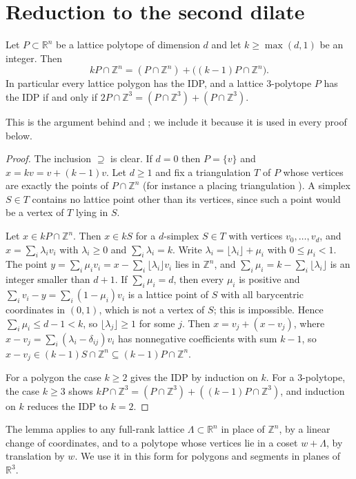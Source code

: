 \documentclass[12pt]{article}
\newcommand{\R}{\mathbb{R}}
\newcommand{\Z}{\mathbb{Z}}
\begin{document}
\section{Reduction to the second dilate}

\begin{lemma}\label{lem:reduction}
Let $P\subset\R^n$ be a lattice polytope of dimension $d$ and let $k\ge\max(d,1)$ be an integer. Then
\[ kP\cap\Z^n=(P\cap\Z^n)+\bigl((k-1)P\cap\Z^n\bigr). \]
In particular every lattice polygon has the IDP, and a lattice $3$-polytope $P$ has the IDP if and only if $2P\cap\Z^3=(P\cap\Z^3)+(P\cap\Z^3)$.
\end{lemma}

This is the argument behind \cite[Theorem~1.3.3]{BGT97} and \cite{EW91}; we include it because it is used in every proof below.

\begin{proof}
The inclusion $\supseteq$ is clear. If $d=0$ then $P=\{v\}$ and $x=kv=v+(k-1)v$. Let $d\ge1$ and fix a triangulation $T$ of $P$ whose vertices are exactly the points of $P\cap\Z^n$ (for instance a placing triangulation \cite{DRS10}). A simplex $S\in T$ contains no lattice point other than its vertices, since such a point would be a vertex of $T$ lying in $S$.

Let $x\in kP\cap\Z^n$. Then $x\in kS$ for a $d$-simplex $S\in T$ with vertices $v_0,\dots,v_d$, and $x=\sum_i\lambda_iv_i$ with $\lambda_i\ge0$ and $\sum_i\lambda_i=k$. Write $\lambda_i=\lfloor\lambda_i\rfloor+\mu_i$ with $0\le\mu_i<1$. The point $y=\sum_i\mu_iv_i=x-\sum_i\lfloor\lambda_i\rfloor v_i$ lies in $\Z^n$, and $\sum_i\mu_i=k-\sum_i\lfloor\lambda_i\rfloor$ is an integer smaller than $d+1$. If $\sum_i\mu_i=d$, then every $\mu_i$ is positive and $\sum_iv_i-y=\sum_i(1-\mu_i)v_i$ is a lattice point of $S$ with all barycentric coordinates in $(0,1)$, which is not a vertex of $S$; this is impossible. Hence $\sum_i\mu_i\le d-1<k$, so $\lfloor\lambda_j\rfloor\ge1$ for some $j$. Then $x=v_j+(x-v_j)$, where $x-v_j=\sum_i(\lambda_i-\delta_{ij})v_i$ has nonnegative coefficients with sum $k-1$, so $x-v_j\in(k-1)S\cap\Z^n\subseteq(k-1)P\cap\Z^n$.

For a polygon the case $k\ge2$ gives the IDP by induction on $k$. For a $3$-polytope, the case $k\ge3$ shows $kP\cap\Z^3=(P\cap\Z^3)+((k-1)P\cap\Z^3)$, and induction on $k$ reduces the IDP to $k=2$.
\end{proof}

The lemma applies to any full-rank lattice $\Lambda\subset\R^n$ in place of $\Z^n$, by a linear change of coordinates, and to a polytope whose vertices lie in a coset $w+\Lambda$, by translation by $w$. We use it in this form for polygons and segments in planes of $\R^3$.
\end{document}
